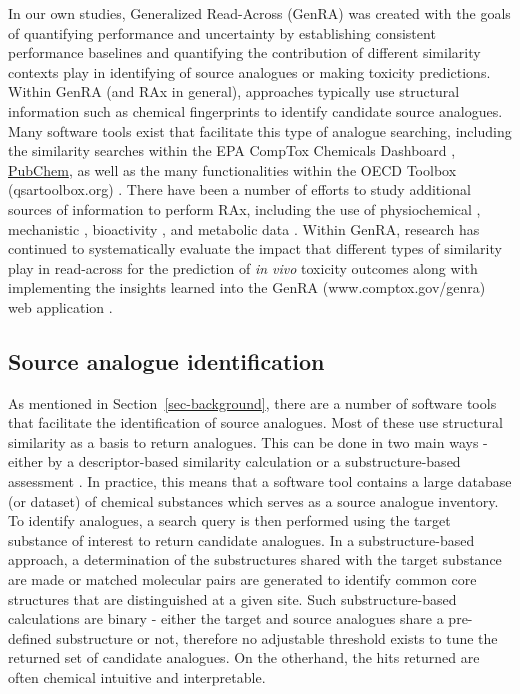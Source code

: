 \documentclass[
  super,
  preprint,
  3p]{elsarticle}
\begin{document}
In our own studies, Generalized Read-Across (GenRA)
\citep{shah_systematically_2016, patlewicz_towards_2023} was created
with the goals of quantifying performance and uncertainty by
establishing consistent performance baselines and quantifying the
contribution of different similarity contexts play in identifying of
source analogues or making toxicity predictions. Within GenRA (and RAx
in general), approaches typically use structural information such as
chemical fingerprints to identify candidate source analogues. Many
software tools exist that facilitate this type of analogue searching,
including the similarity searches within the EPA CompTox Chemicals
Dashboard \citep{williams_comptox_2017},
\href{https://pubchem.ncbi.nlm.nih.gov/}{PubChem}, as well as the many
functionalities within the OECD Toolbox (qsartoolbox.org)
\citep{schultz_oecd_2018}. There have been a number of efforts to study
additional sources of information to perform RAx, including the use of
physiochemical \citep{helman_extending_2018}, mechanistic
\citep{escher_towards_2019}, bioactivity
\citep{shah_systematically_2016, escher_towards_2019}, and metabolic
data \citep{lester_quantifying_2023, gadaleta_automated_2020}. Within
GenRA, research has continued to systematically evaluate the impact that
different types of similarity play in read-across for the prediction of
\emph{in vivo} toxicity
outcomes\citep{patlewicz_systematic_2024, tate_repeat-dose_2021, helman_extending_2018, nelms_mechanistic_2018, boyce_comparing_2022}
along with implementing the insights learned into the GenRA
(www.comptox.gov/genra) web application
\citep{patlewicz_towards_2023, shah_genra_2024}.

\subsection{Source analogue
identification}\label{source-analogue-identification}

As mentioned in Section~\ref{sec-background}, there are a number of
software tools that facilitate the identification of source analogues.
Most of these use structural similarity as a basis to return analogues.
This can be done in two main ways - either by a descriptor-based
similarity calculation or a substructure-based assessment
\citep{kunimoto_maximum_2016}. In practice, this means that a software
tool contains a large database (or dataset) of chemical substances which
serves as a source analogue inventory. To identify analogues, a search
query is then performed using the target substance of interest to return
candidate analogues. In a substructure-based approach, a determination
of the substructures shared with the target substance are made or
matched molecular pairs \citep{oboyle_using_2014, noauthor_matched_2021}
are generated to identify common core structures that are distinguished
at a given site. Such substructure-based calculations are binary -
either the target and source analogues share a pre-defined substructure
or not, therefore no adjustable threshold exists to tune the returned
set of candidate analogues. On the otherhand, the hits returned are
often chemical intuitive and interpretable.
\end{document}
